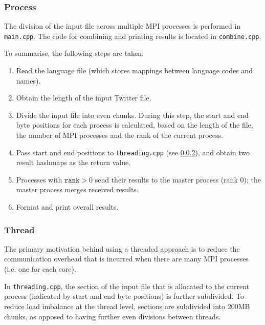 \documentclass[10pt]{article}
\begin{document}

\subsubsection{Process}
The division of the input file across multiple MPI processes is performed in \texttt{main.cpp}.
The code for combining and printing results is located in \texttt{combine.cpp}. 

To summarise, the following steps are taken:

\begin{enumerate}[topsep=2pt]

    \item Read the language file (which stores mappings between language codes and names).
    \item Obtain the length of the input Twitter file.
    \item Divide the input file into even chunks. During this step, the start and end byte positions for each process is calculated, based on the length of the file, the number of MPI processes and the rank of the current process.
    \item Pass start and end positions to \texttt{threading.cpp} (see \ref{thread}), and obtain two result hashmaps as the return value.
    \item Processes with $\texttt{rank} > 0$ send their results to the master process (rank 0); the master process merges received results. 
    \item Format and print overall results.
\end{enumerate}

\subsubsection{Thread}\label{thread}
The primary motivation behind using a threaded approach is to reduce the communication overhead that is incurred when there are many MPI processes (i.e. one for each core). 

In \texttt{threading.cpp}, the section of the input file that is allocated to the current process (indicated by start and end byte positions) is further subdivided. 
To reduce load imbalance at the thread level, sections are subdivided into 200MB chunks, as opposed to having further even divisions between threads. 
\end{document}
